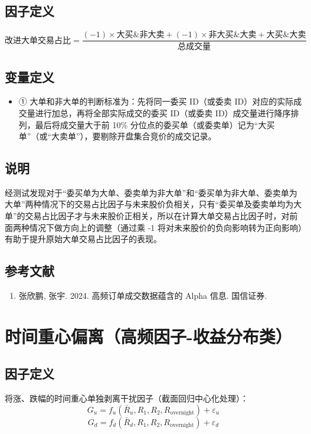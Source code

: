 \documentclass{article}
\begin{document}
\subsection{因子定义}
\begin{equation}
    \text{改进大单交易占比} = \frac{(-1) \times \text{大买} \& \text{非大卖} + (-1) \times \text{非大买}\&\text{大卖} + \text{大买}\&\text{大卖}}{\text{总成交量}}
\end{equation}

\subsection{变量定义}
\begin{itemize}
    \item ① 大单和非大单的判断标准为：先将同一委买 ID（或委卖 ID）对应的实际成交量进行加总，再将全部实际成交的委买 ID（或委卖 ID）成交量进行降序排列，最后将成交量大于前 10\% 分位点的委买单（或委卖单）记为“大买单”（或“大卖单”），要剔除开盘集合竞价的成交记录。
\end{itemize}

\subsection{说明}
经测试发现对于“委买单为大单、委卖单为非大单”和“委买单为非大单、委卖单为大单”两种情况下的交易占比因子与未来股价负相关，只有“委买单及委卖单均为大单”的交易占比因子才与未来股价正相关，所以在计算大单交易占比因子时，对前面两种情况下做方向上的调整（通过乘 -1 将对未来股价的负向影响转为正向影响）有助于提升原始大单交易占比因子的表现。

\subsection{参考文献}
\begin{enumerate}
    \item 张欣鹏, 张宇. 2024. 高频订单成交数据蕴含的 Alpha 信息. 国信证券.
\end{enumerate}

\section{时间重心偏离（高频因子-收益分布类）}

\subsection{因子定义}
将涨、跌幅的时间重心单独剥离干扰因子（截面回归中心化处理）：
\begin{equation}
    G_u = f_u(\bar{R}_u, R_1, R_2, R_{\mathrm{overnight}}) + \varepsilon_u
\end{equation}
\begin{equation}
    G_d = f_d(\bar{R}_d, R_1, R_2, R_{\mathrm{overnight}}) + \varepsilon_d
\end{equation}
\end{document}
